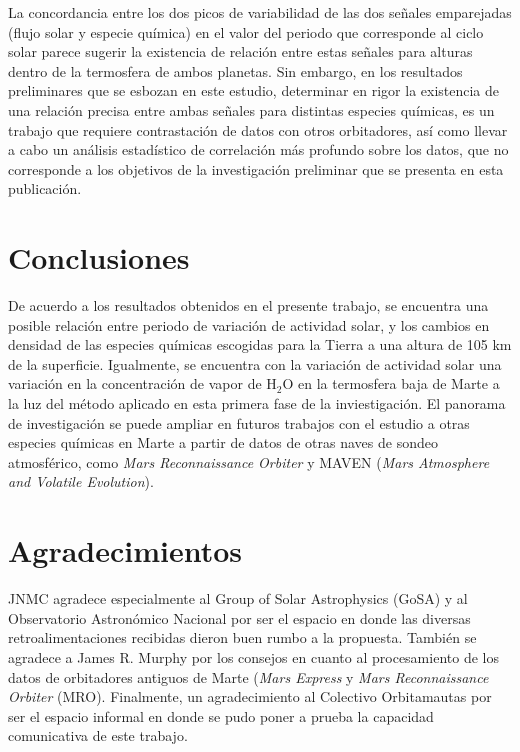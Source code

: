 \documentclass[a4paper,alpha-refs]{eSpectra}
\begin{document}
La concordancia entre los dos picos de variabilidad de las dos se\~nales emparejadas (flujo solar y especie qu\'imica) en el valor del periodo que corresponde al ciclo solar parece sugerir la existencia de relación entre estas se\~nales para alturas dentro de la termosfera de ambos planetas. Sin embargo, en los resultados preliminares que se esbozan en este estudio, determinar en rigor la existencia de una relación precisa entre ambas se\~nales para distintas especies qu\'imicas, es un trabajo que requiere contrastaci\'on de datos con otros orbitadores, as\'i como llevar a cabo un an\'alisis estad\'istico de correlaci\'on m\'as profundo sobre los datos, que no corresponde a los objetivos de la investigación preliminar que se presenta en esta publicaci\'on.



\section{Conclusiones}

De acuerdo a los resultados obtenidos en el presente trabajo, se encuentra una posible relación entre periodo de variaci\'on de actividad solar, y los cambios en densidad de las especies qu\'imicas escogidas para la Tierra a una altura de 105 km de la superficie. Igualmente, se encuentra con la variaci\'on de actividad solar una variación en la concentraci\'on de vapor de H$_2$O en la termosfera baja de Marte a la luz del m\'etodo aplicado en esta primera fase de la inviestigaci\'on. El panorama de investigación se puede ampliar en futuros trabajos con el estudio a otras especies qu\'imicas en Marte a partir de datos de otras naves de sondeo atmosf\'erico, como \textit{Mars Reconnaissance Orbiter} y MAVEN (\textit{Mars Atmosphere and Volatile Evolution}). 


\section*{Agradecimientos}

JNMC agradece especialmente al Group of Solar Astrophysics (GoSA) y al Observatorio Astronómico Nacional por ser el espacio en donde las diversas retroalimentaciones recibidas dieron buen rumbo a la propuesta.  También se agradece a James R. Murphy  por los consejos en cuanto al procesamiento de los datos de orbitadores antiguos de Marte (\textit{Mars Express} y \textit{Mars Reconnaissance Orbiter} (MRO). Finalmente, un agradecimiento al Colectivo Orbitamautas por ser el espacio informal en donde se pudo poner a prueba la capacidad comunicativa de este trabajo. 
\end{document}
